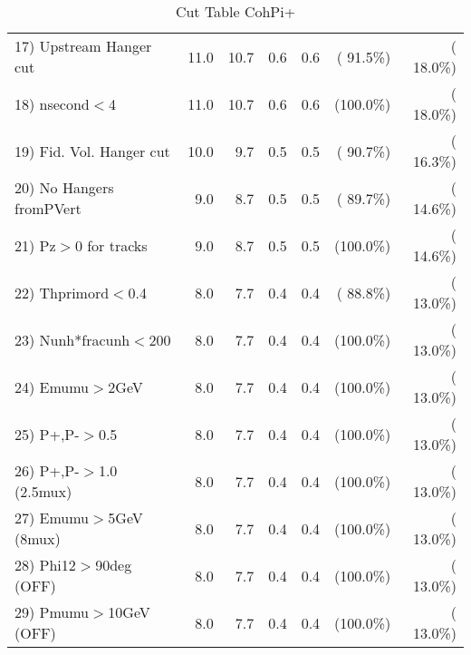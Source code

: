 \begin{table}[h!]
\begin{tabular}{||l||r|r|r|r|r|r||}
 17) Upstream Hanger cut  &         11.0 &         10.7 &          0.6 &          0.6 & ( 91.5\%) & ( 18.0\%) \\
 18) nsecond$<$4          &         11.0 &         10.7 &          0.6 &          0.6 & (100.0\%) & ( 18.0\%) \\
 19) Fid. Vol. Hanger cut &         10.0 &          9.7 &          0.5 &          0.5 & ( 90.7\%) & ( 16.3\%) \\
 20) No Hangers fromPVert &          9.0 &          8.7 &          0.5 &          0.5 & ( 89.7\%) & ( 14.6\%) \\
 21) Pz$>$0 for tracks    &          9.0 &          8.7 &          0.5 &          0.5 & (100.0\%) & ( 14.6\%) \\
 22) Thprimord$<$0.4      &          8.0 &          7.7 &          0.4 &          0.4 & ( 88.8\%) & ( 13.0\%) \\
 23) Nunh*fracunh$<$200   &          8.0 &          7.7 &          0.4 &          0.4 & (100.0\%) & ( 13.0\%) \\
 24) Emumu$>$2GeV         &          8.0 &          7.7 &          0.4 &          0.4 & (100.0\%) & ( 13.0\%) \\
 25) P+,P-$>$0.5          &          8.0 &          7.7 &          0.4 &          0.4 & (100.0\%) & ( 13.0\%) \\
 26) P+,P-$>$1.0 (2.5mux) &          8.0 &          7.7 &          0.4 &          0.4 & (100.0\%) & ( 13.0\%) \\
 27) Emumu$>$5GeV  (8mux) &          8.0 &          7.7 &          0.4 &          0.4 & (100.0\%) & ( 13.0\%) \\
 28) Phi12$>$90deg  (OFF) &          8.0 &          7.7 &          0.4 &          0.4 & (100.0\%) & ( 13.0\%) \\
 29) Pmumu$>$10GeV  (OFF) &          8.0 &          7.7 &          0.4 &          0.4 & (100.0\%) & ( 13.0\%) \\
 \hline
 \hline
 \end{tabular}
 \caption{Cut Table  CohPi+   }
 \label{tab-cutcohjpsi-mumu_nuecc}
 \end{table}
